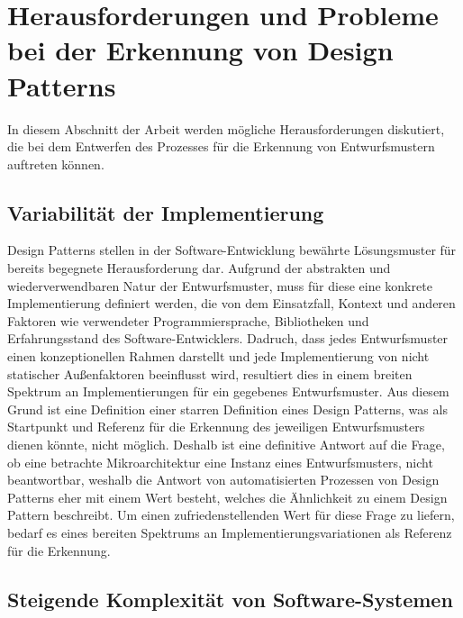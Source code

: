 \section{Herausforderungen und Probleme bei der Erkennung von Design Patterns}

In diesem Abschnitt der Arbeit werden mögliche Herausforderungen diskutiert, die bei dem Entwerfen des Prozesses für die Erkennung von Entwurfsmustern auftreten können. 

\subsection*{Variabilität der Implementierung}

Design Patterns stellen in der Software-Entwicklung bewährte Lösungsmuster für bereits begegnete Herausforderung dar. Aufgrund der abstrakten und wiederverwendbaren Natur der Entwurfsmuster,
muss für diese eine konkrete Implementierung definiert werden, die von dem Einsatzfall, Kontext und anderen Faktoren wie verwendeter Programmiersprache, Bibliotheken und Erfahrungsstand des Software-Entwicklers.
Dadruch, dass jedes Entwurfsmuster einen konzeptionellen Rahmen darstellt und jede Implementierung von nicht statischer Außenfaktoren beeinflusst wird, resultiert dies in einem breiten Spektrum an Implementierungen für ein gegebenes Entwurfsmuster.
Aus diesem Grund ist eine Definition einer starren Definition eines Design Patterns, was als Startpunkt und Referenz für die Erkennung des jeweiligen Entwurfsmusters dienen könnte, nicht möglich. 
Deshalb ist eine definitive Antwort auf die Frage, ob eine betrachte Mikroarchitektur eine Instanz eines Entwurfsmusters, nicht beantwortbar, weshalb die Antwort von automatisierten Prozessen von Design Patterns eher mit einem Wert besteht,
welches die Ähnlichkeit zu einem Design Pattern beschreibt. Um einen zufriedenstellenden Wert für diese Frage zu liefern, bedarf es eines bereiten Spektrums an Implementierungsvariationen als Referenz für die Erkennung.

\subsection*{Steigende Komplexität von Software-Systemen}

